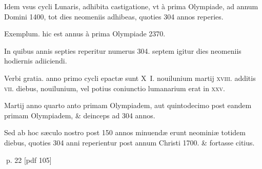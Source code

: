 \begin{parnumbers}
Idem vsus cycli Lunaris, adhibita castigatione, vt à prima Olympiade, ad annum Domini 1400, tot dies neomeniis adhibeas, quoties 304 annos reperies.

Exemplum. hic est annus à prima Olympiade 2370.

In quibus annis septies reperitur  numerus 304. septem igitur dies neomeniis hodiernis adiiciendi.

Verbi gratia. anno primo cycli epactæ sunt X I. nouilunium martij \textsc{xviii}. additis \textsc{vii}. diebus, nouilunium, vel potius coniunctio lumanarium erat in \textsc{xxv}.

Martij anno quarto anto primam Olympiadem, aut quintodecimo post eandem primam Olympiadem, \& deinceps ad 304 annos.

Sed ab hoc sæculo nostro post 150 annos minuendæ erunt neominiæ totidem diebus, quoties 304 anni reperientur post annum Christi 1700. \& fortasse citius.

\end{parnumbers}
\clearpage
p. 22 [pdf 105]


